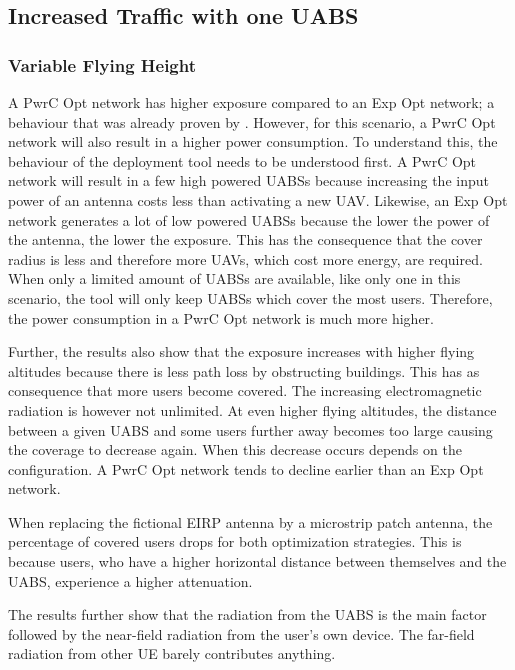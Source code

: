 \documentclass[twocolumn]{phdsymp} %
\begin{document}
\subsection{Increased Traffic with one UABS}
\subsubsection{Variable Flying Height}
A \gls{PwrC Opt} network has higher exposure compared to an \gls{Exp Opt} network; a behaviour that was already proven by \cite{J1}. 
However, for this scenario, a \gls{PwrC Opt} network will also result in a higher power consumption. 
To understand this, the behaviour of the deployment tool needs to be understood first. 
A \gls{PwrC Opt} network will result in a few high powered \gls{UABS}s because increasing the input power of an antenna costs 
less than activating a new  \gls{UAV}. Likewise, an \gls{Exp Opt} network 
generates a lot of low powered \gls{UABS}s because the lower the power of the antenna, the lower the exposure. This has the consequence that the cover radius 
is less and therefore more UAVs, which cost more energy, are required.
When only a limited amount of \gls{UABS}s are available, 
like only one in this scenario, the tool will only keep \gls{UABS}s which cover the most users. 
Therefore, the power consumption in a \gls{PwrC Opt} network is much more higher. 

Further, the results also show that the exposure increases with higher flying altitudes
because there is less path loss by obstructing buildings. This has as consequence that  
more users become covered. 
The increasing electromagnetic radiation is however not unlimited.
At even higher
flying altitudes, the distance between a given \gls{UABS} and some users further away becomes too large causing the 
coverage to decrease again. When this decrease occurs depends on the configuration. A \gls{PwrC Opt} 
network tends to decline earlier than an \gls{Exp Opt} network.

When replacing the fictional \gls{EIRP} antenna by a microstrip patch antenna, the percentage of covered users drops for both 
optimization strategies. This is because users, who have a higher horizontal distance between themselves and the \gls{UABS}, 
experience a higher attenuation.

The results further show  
that the radiation from the \gls{UABS} is the main factor followed by the near-field radiation from the user's own device.
The far-field radiation from other \gls{UE} barely contributes anything.
\end{document}
